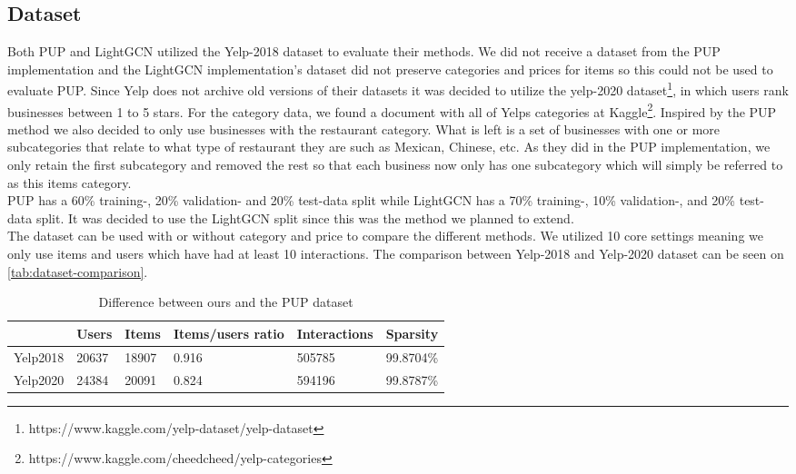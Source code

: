 \subsection{Dataset} \label{equal-data}
Both PUP and LightGCN utilized the Yelp-2018 dataset to evaluate their methods.
We did not receive a dataset from the PUP implementation and the LightGCN implementation's dataset did not preserve categories and prices for items so this could not be used to evaluate PUP.
Since Yelp does not archive old versions of their datasets it was decided to utilize the yelp-2020 dataset\footnote{https://www.kaggle.com/yelp-dataset/yelp-dataset}, in which users rank businesses between 1 to 5 stars.
For the category data, we found a document with all of Yelps categories at Kaggle\footnote{https://www.kaggle.com/cheedcheed/yelp-categories}.
Inspired by the PUP method we also decided to only use businesses with the restaurant category.
What is left is a set of businesses with one or more subcategories that relate to what type of restaurant they are such as Mexican, Chinese, etc.
As they did in the PUP implementation, we only retain the first subcategory and removed the rest so that each business now only has one subcategory which will simply be referred to as this items category.
\\
PUP has a 60\% training-, 20\% validation- and 20\% test-data split while LightGCN has a 70\% training-, 10\% validation-, and 20\% test-data split.
It was decided to use the LightGCN split since this was the method we planned to extend.
\\
The dataset can be used with or without category and price to compare the different methods.
We utilized 10 core settings meaning we only use items and users which have had at least 10 interactions.
The comparison between Yelp-2018 and Yelp-2020 dataset can be seen on \autoref{tab:dataset-comparison}.
\begin{table*}[]
    \centering
    \begin{tabular}{|l|l|l|l|l|l|}
    \hline
                 & Users & Items & Items/users ratio & Interactions & Sparsity  \\ \hline
        Yelp2018 & 20637 & 18907 & 0.916             & 505785       & 99.8704\% \\ \hline
        Yelp2020 & 24384 & 20091 & 0.824             & 594196       & 99.8787\% \\ \hline
    \end{tabular}
    \caption{Difference between ours and the PUP dataset}
    \label{tab:dataset-comparison}
\end{table*}
